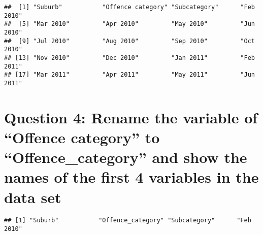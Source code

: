 \documentclass[
]{article}
\newenvironment{Shaded}{\begin{snugshade}}{\end{snugshade}}
\newcommand{\CommentTok}[1]{\textcolor[rgb]{0.56,0.35,0.01}{\textit{#1}}}
\newcommand{\DataTypeTok}[1]{\textcolor[rgb]{0.13,0.29,0.53}{#1}}
\newcommand{\DecValTok}[1]{\textcolor[rgb]{0.00,0.00,0.81}{#1}}
\newcommand{\KeywordTok}[1]{\textcolor[rgb]{0.13,0.29,0.53}{\textbf{#1}}}
\newcommand{\NormalTok}[1]{#1}
\newcommand{\OperatorTok}[1]{\textcolor[rgb]{0.81,0.36,0.00}{\textbf{#1}}}
\newcommand{\StringTok}[1]{\textcolor[rgb]{0.31,0.60,0.02}{#1}}
\begin{document}
\begin{Shaded}
\end{Shaded}

\begin{verbatim}
##  [1] "Suburb"           "Offence category" "Subcategory"      "Feb 2010"        
##  [5] "Mar 2010"         "Apr 2010"         "May 2010"         "Jun 2010"        
##  [9] "Jul 2010"         "Aug 2010"         "Sep 2010"         "Oct 2010"        
## [13] "Nov 2010"         "Dec 2010"         "Jan 2011"         "Feb 2011"        
## [17] "Mar 2011"         "Apr 2011"         "May 2011"         "Jun 2011"
\end{verbatim}

\hypertarget{question-4-rename-the-variable-of-offence-category-to-offence_category-and-show-the-names-of-the-first-4-variables-in-the-data-set}{%
\section{Question 4: Rename the variable of ``Offence category'' to
``Offence\_category'' and show the names of the first 4 variables in the
data
set}\label{question-4-rename-the-variable-of-offence-category-to-offence_category-and-show-the-names-of-the-first-4-variables-in-the-data-set}}

\begin{Shaded}
\end{Shaded}

\begin{verbatim}
## [1] "Suburb"           "Offence_category" "Subcategory"      "Feb 2010"
\end{verbatim}
\end{document}
